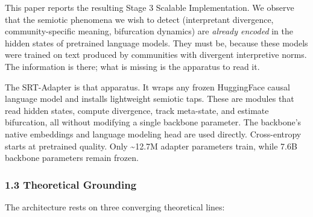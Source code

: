 \documentclass[
  11pt]{article}
\begin{document}
This paper reports the resulting Stage 3 Scalable Implementation. We
observe that the semiotic phenomena we wish to detect (interpretant
divergence, community-specific meaning, bifurcation dynamics) are
\emph{already encoded} in the hidden states of pretrained language
models. They must be, because these models were trained on text produced
by communities with divergent interpretive norms. The information is
there; what is missing is the apparatus to read it.

The SRT-Adapter is that apparatus. It wraps any frozen HuggingFace
causal language model and installs lightweight semiotic taps. These are
modules that read hidden states, compute divergence, track meta-state,
and estimate bifurcation, all without modifying a single backbone
parameter. The backbone's native embeddings and language modeling head
are used directly. Cross-entropy starts at pretrained quality. Only
\textasciitilde12.7M adapter parameters train, while 7.6B backbone
parameters remain frozen.

\subsubsection{1.3 Theoretical Grounding}\label{theoretical-grounding}

The architecture rests on three converging theoretical lines:
\end{document}
